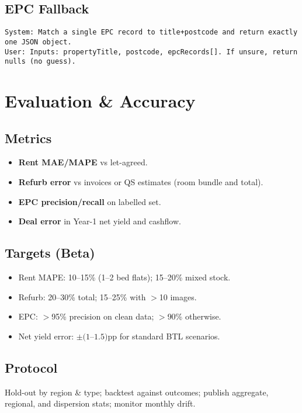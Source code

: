 \documentclass[12pt,a4paper]{article}
\begin{document}
\subsection{EPC Fallback}
\begin{lstlisting}
System: Match a single EPC record to title+postcode and return exactly one JSON object.
User: Inputs: propertyTitle, postcode, epcRecords[]. If unsure, return nulls (no guess).
\end{lstlisting}

\section{Evaluation \& Accuracy}
\subsection{Metrics}
\begin{itemize}[leftmargin=1.5em]
  \item \textbf{Rent MAE/MAPE} vs let-agreed.
  \item \textbf{Refurb error} vs invoices or QS estimates (room bundle and total).
  \item \textbf{EPC precision/recall} on labelled set.
  \item \textbf{Deal error} in Year-1 net yield and cashflow.
\end{itemize}

\subsection{Targets (Beta)}
\begin{itemize}[leftmargin=1.5em]
  \item Rent MAPE: 10--15\% (1--2 bed flats); 15--20\% mixed stock.
  \item Refurb: 20--30\% total; 15--25\% with $>$10 images.
  \item EPC: $>$95\% precision on clean data; $>$90\% otherwise.
  \item Net yield error: $\pm(1$--$1.5)$pp for standard BTL scenarios.
\end{itemize}

\subsection{Protocol}
Hold-out by region \& type; backtest against outcomes; publish aggregate, regional, and dispersion stats; monitor monthly drift.
\end{document}

